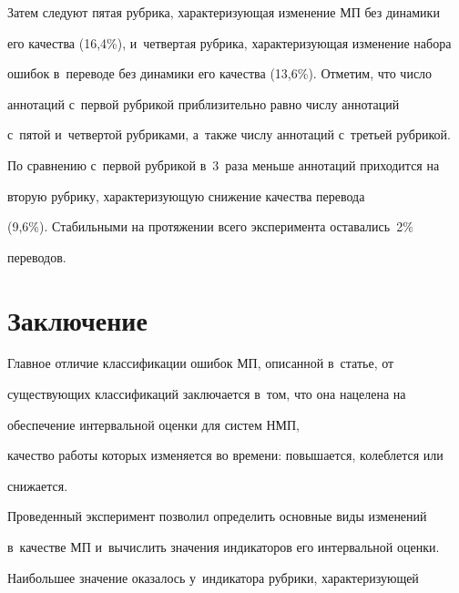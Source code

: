    Затем следуют пятая рубрика, характеризующая изменение МП без динамики 


его качества (16,4\%), и~четвертая рубрика, характеризующая изменение набора 


ошибок в~переводе без динамики его качества (13,6\%). Отметим, что число 


аннотаций с~первой руб\-ри\-кой приблизительно рав\-но чис\-лу аннотаций 


с~пятой и~четвертой рубриками, а~так\-же числу аннотаций с~треть\-ей руб\-ри\-кой. 


По сравнению с~первой рубрикой в~3~раза меньше аннотаций приходится на 


вторую руб\-ри\-ку, ха\-рак\-те\-ри\-зу\-ющую снижение качества перевода 


(9,6\%). Стабильными на протяжении всего эксперимента оставались~2\% 


переводов.





\vspace*{-4pt}


   


  \section{Заключение }


  


  \vspace*{-2pt}


  


   Главное отличие классификации ошибок МП, описанной в~статье, от 


существующих классификаций заключается в~том, что она нацелена на 


обеспечение интервальной оценки для сис\-тем НМП, 


качество работы которых изменяется во времени: повышается, колеблется или 


снижается.


   


   Проведенный эксперимент позволил определить основные виды изменений 


в~качестве МП и~вычислить значения индикаторов его интервальной оценки. 


Наибольшее значение оказалось у~индикатора рубрики, характеризующей 


